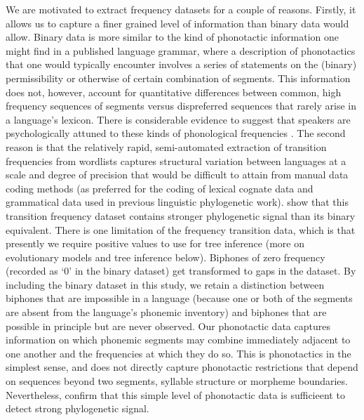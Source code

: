 \documentclass[]{article}
\begin{document}
We are motivated to extract frequency datasets for a couple of reasons. Firstly, it allows us to capture a finer grained level of information than binary data would allow. Binary data is more similar to the kind of phonotactic information one might find in a published language grammar, where a description of phonotactics that one would typically encounter involves a series of statements on the (binary) permissibility or otherwise of certain combination of segments. This information does not, however, account for quantitative differences between common, high frequency sequences of segments versus dispreferred sequences that rarely arise in a language's lexicon. There is considerable evidence to suggest that speakers are psychologically attuned to these kinds of phonological frequencies \autocites{coleman_stochastic_1997}{zuraw_patterned_2000}{ernestus_predicting_2003}{albright_rules_2003}{eddington_spanish_2004}{hayes_stochastic_2006}{gordon_phonological_2016}. The second reason is that the relatively rapid, semi-automated extraction of transition frequencies from wordlists captures structural variation between languages at a scale and degree of precision that would be difficult to attain from manual data coding methods (as preferred for the coding of lexical cognate data and grammatical data used in previous linguistic phylogenetic work). \textcite{macklin-cordes_phylogenetic_2020} show that this transition frequency dataset contains stronger phylogenetic signal than its binary equivalent. There is one limitation of the frequency transition data, which is that presently we require positive values to use for tree inference (more on evolutionary models and tree inference below). Biphones of zero frequency (recorded as `0' in the binary dataset) get transformed to gaps in the dataset. By including the binary dataset in this study, we retain a distinction between biphones that are impossible in a language (because one or both of the segments are absent from the language's phonemic inventory) and biphones that are possible in principle but are never observed. Our phonotactic data captures information on which phonemic segments may combine immediately adjacent to one another and the frequencies at which they do so. This is phonotactics in the simplest sense, and does not directly capture phonotactic restrictions that depend on sequences beyond two segments, syllable structure or morpheme boundaries. Nevertheless, \textcite{macklin-cordes_phylogenetic_2020} confirm that this simple level of phonotactic data is sufficieent to detect strong phylogenetic signal.
\end{document}
